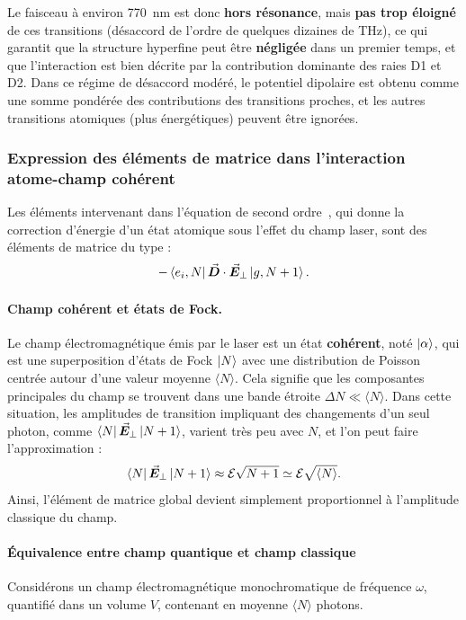 Le faisceau à environ 770~nm est donc \textbf{hors résonance}, mais \textbf{pas trop éloigné} de ces transitions (désaccord de l’ordre de quelques dizaines de THz), ce qui garantit que la structure hyperfine peut être \textbf{négligée} dans un premier temps, et que l’interaction est bien décrite par la contribution dominante des raies D1 et D2. Dans ce régime de désaccord modéré, le potentiel dipolaire est obtenu comme une somme pondérée des contributions des transitions proches, et les autres transitions atomiques (plus énergétiques) peuvent être ignorées.

\subsubsection*{Expression des éléments de matrice dans l’interaction atome-champ cohérent}

Les éléments intervenant dans l’équation de second ordre~, qui donne la correction d’énergie d’un état atomique sous l’effet du champ laser, sont des éléments de matrice du type :
\[
-\bra{e_i, N} \vec{{\bm{D}}} \cdot \vec{{\bm{E}}}_\perp \ket{g, N + 1}.
\]


\paragraph{Champ cohérent et états de Fock.} Le champ électromagnétique émis par le laser est un état \textbf{cohérent}, noté \( \ket{\alpha} \), qui est une superposition d’états de Fock \( \ket{N} \) avec une distribution de Poisson centrée autour d’une valeur moyenne \( \langle N \rangle \). Cela signifie que les composantes principales du champ se trouvent dans une bande étroite \( \Delta N \ll \langle N \rangle \). Dans cette situation, les amplitudes de transition impliquant des changements d’un seul photon, comme \( \bra{N} \vec{{\bm{E}}}_\perp \ket{N+1} \), varient très peu avec \( N \), et l’on peut faire l’approximation :
\[
\bra{N} \vec{{\bm{E}}}_\perp \ket{N+1} \approx \mathcal{E} \sqrt{N+1} \simeq \mathcal{E} \sqrt{\langle N \rangle}.
\]
Ainsi, l’élément de matrice global devient simplement proportionnel à l’amplitude classique du champ.

\paragraph{Équivalence entre champ quantique et champ classique}

Considérons un champ électromagnétique monochromatique de fréquence \( \omega \), quantifié dans un volume \( V \), contenant en moyenne \( \langle N \rangle \) photons.

